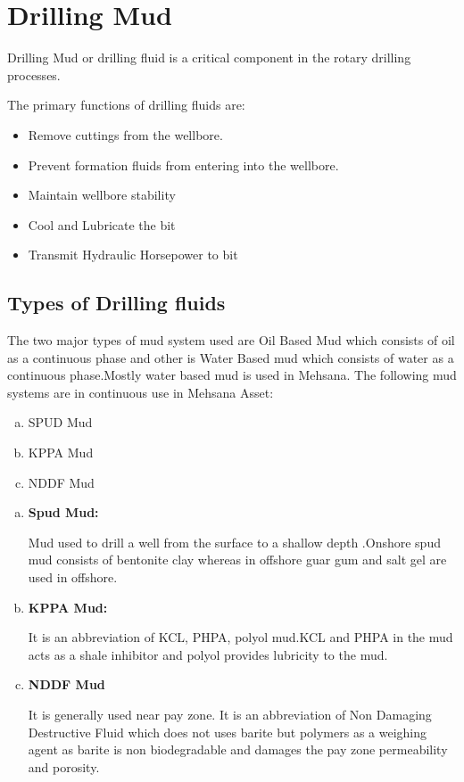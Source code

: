 \section{Drilling Mud}
	
Drilling Mud or drilling fluid is a critical component in the rotary drilling processes.

The primary functions of drilling fluids are:

\begin{itemize}

\item Remove cuttings from the wellbore.
\item Prevent formation fluids from entering into the wellbore.
\item Maintain wellbore stability
\item Cool and Lubricate the bit
\item Transmit Hydraulic Horsepower to bit

\end{itemize}

\subsection*{Types of Drilling fluids}

The two major types of mud system used are Oil Based Mud which consists of oil 
as a continuous phase and other is Water Based mud which consists of water as 
a continuous phase.Mostly water based mud is used in Mehsana. The following 
mud systems are in continuous use in Mehsana Asset:

\begin{enumerate}[(a)]

\item SPUD Mud
\item KPPA Mud
\item NDDF Mud

\end{enumerate}

\begin{enumerate}[(a)]

\item \textbf{Spud Mud:}

Mud used to drill a well from the surface to a shallow depth .Onshore spud mud
consists of bentonite clay whereas in offshore guar gum and salt gel are used 
in offshore.

\item \textbf{KPPA Mud:}

It is an abbreviation of KCL, PHPA, polyol mud.KCL and PHPA in the mud acts as 
a shale inhibitor and polyol provides lubricity to the mud.

\item \textbf{NDDF Mud}

It is generally used near pay zone. It is an abbreviation of Non Damaging 
Destructive Fluid which does not uses barite but polymers as a weighing agent as 
barite is non biodegradable and damages the pay zone permeability and porosity.
\end{enumerate}



